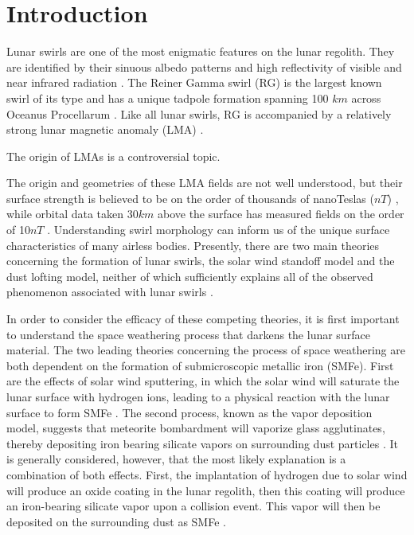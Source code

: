 \chapter{Introduction}
\label{introchap}

Lunar swirls are one of the most enigmatic features on the lunar regolith.  They are identified by their sinuous albedo patterns and high reflectivity of visible and near infrared radiation \cite{denevi2016distribution}.  The Reiner Gamma swirl (RG) is the largest known swirl of its type and has a unique tadpole formation spanning 100 $km$ across Oceanus Procellarum \cite{denevi2016distribution}.  Like all lunar swirls, RG is accompanied by a relatively strong lunar magnetic anomaly (LMA) \cite{blewett2011lunar}. \par  

The origin of LMAs is a controversial topic.  

The origin and geometries of these LMA fields are not well understood, but their surface strength is believed to be on the order of thousands of nanoTeslas ($nT$) \cite{bibid}, while orbital data taken 30$km$ above the surface has measured fields on the order of 10$nT$ \cite{blewett2011lunar}.  Understanding swirl morphology can inform us of the unique surface characteristics of many airless bodies.  Presently, there are two main theories concerning the formation of lunar swirls, the solar wind standoff model and the dust lofting model, neither of which sufficiently explains all of the observed phenomenon associated with lunar swirls \cite{garrick2011spectral}\cite{blewett2011lunar}.  \par

In order to consider the efficacy of these competing theories, it is first important to understand the space weathering process that darkens the lunar surface material.  The two leading theories concerning the process of space weathering are both dependent on the formation of submicroscopic metallic iron (SMFe).  First are the effects of solar wind sputtering, in which the solar wind will saturate the lunar surface with hydrogen ions, leading to a physical reaction with the lunar surface to form SMFe \cite{hapke1973darkening}.  The second process, known as the vapor deposition model, suggests that meteorite bombardment will vaporize glass agglutinates, thereby depositing iron bearing silicate vapors on surrounding dust particles \cite{hapke2001space}.  It is generally considered, however, that the most likely explanation is a combination of both effects.  First, the implantation of hydrogen due to solar wind will produce an oxide coating in the lunar regolith, then this coating will produce an iron-bearing silicate vapor upon a collision event.  This vapor will then be deposited on the surrounding dust as SMFe \cite{hapke2001space}. \par

